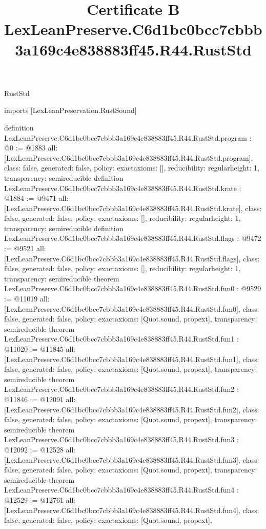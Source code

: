 \begin{lexlean}{RustStd}
\title{Certificate B LexLeanPreserve.C6d1bc0bcc7cbbb3a169c4e838883ff45.R44.RustStd}
\begin{coremodule}
imports [LexLeanPreservation.RustSound]

definition LexLeanPreserve.C6d1bc0bcc7cbbb3a169c4e838883ff45.R44.RustStd.program : @0 := @1883 {
  all: [LexLeanPreserve.C6d1bc0bcc7cbbb3a169c4e838883ff45.R44.RustStd.program],
  class: false,
  generated: false,
  policy: exact{axioms: []},
  reducibility: regular{height: 1},
  transparency: semireducible
}
definition LexLeanPreserve.C6d1bc0bcc7cbbb3a169c4e838883ff45.R44.RustStd.krate : @1884 := @9471 {
  all: [LexLeanPreserve.C6d1bc0bcc7cbbb3a169c4e838883ff45.R44.RustStd.krate],
  class: false,
  generated: false,
  policy: exact{axioms: []},
  reducibility: regular{height: 1},
  transparency: semireducible
}
definition LexLeanPreserve.C6d1bc0bcc7cbbb3a169c4e838883ff45.R44.RustStd.flags : @9472 := @9521 {
  all: [LexLeanPreserve.C6d1bc0bcc7cbbb3a169c4e838883ff45.R44.RustStd.flags],
  class: false,
  generated: false,
  policy: exact{axioms: []},
  reducibility: regular{height: 1},
  transparency: semireducible
}
theorem LexLeanPreserve.C6d1bc0bcc7cbbb3a169c4e838883ff45.R44.RustStd.fun0 : @9529 := @11019 {
  all: [LexLeanPreserve.C6d1bc0bcc7cbbb3a169c4e838883ff45.R44.RustStd.fun0],
  class: false,
  generated: false,
  policy: exact{axioms: [Quot.sound, propext]},
  transparency: semireducible
}
theorem LexLeanPreserve.C6d1bc0bcc7cbbb3a169c4e838883ff45.R44.RustStd.fun1 : @11020 := @11845 {
  all: [LexLeanPreserve.C6d1bc0bcc7cbbb3a169c4e838883ff45.R44.RustStd.fun1],
  class: false,
  generated: false,
  policy: exact{axioms: [Quot.sound, propext]},
  transparency: semireducible
}
theorem LexLeanPreserve.C6d1bc0bcc7cbbb3a169c4e838883ff45.R44.RustStd.fun2 : @11846 := @12091 {
  all: [LexLeanPreserve.C6d1bc0bcc7cbbb3a169c4e838883ff45.R44.RustStd.fun2],
  class: false,
  generated: false,
  policy: exact{axioms: [Quot.sound, propext]},
  transparency: semireducible
}
theorem LexLeanPreserve.C6d1bc0bcc7cbbb3a169c4e838883ff45.R44.RustStd.fun3 : @12092 := @12528 {
  all: [LexLeanPreserve.C6d1bc0bcc7cbbb3a169c4e838883ff45.R44.RustStd.fun3],
  class: false,
  generated: false,
  policy: exact{axioms: [Quot.sound, propext]},
  transparency: semireducible
}
theorem LexLeanPreserve.C6d1bc0bcc7cbbb3a169c4e838883ff45.R44.RustStd.fun4 : @12529 := @12761 {
  all: [LexLeanPreserve.C6d1bc0bcc7cbbb3a169c4e838883ff45.R44.RustStd.fun4],
  class: false,
  generated: false,
  policy: exact{axioms: [Quot.sound, propext]},
}
\end{coremodule}
\end{lexlean}
